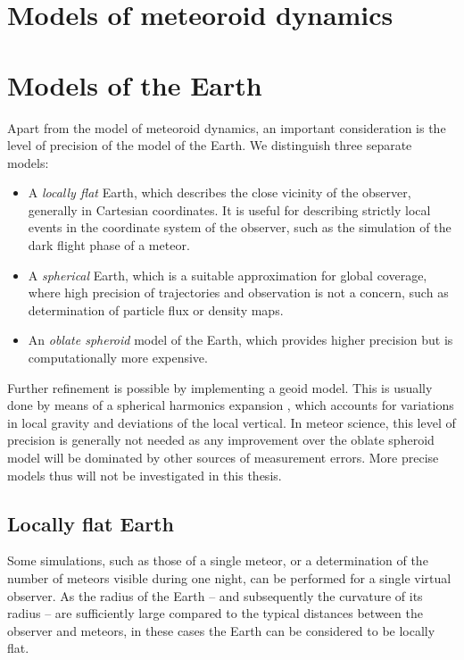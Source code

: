 



\section{Models of meteoroid dynamics} \label{mm}





\section{Models of the Earth} \label{mE}
    Apart from the model of meteoroid dynamics, an important consideration is the level of precision
    of the model of the Earth. We distinguish three separate models:

    \begin{itemize}
        \item A \emph{locally flat} Earth, which describes the close vicinity of the observer,
            generally in Cartesian coordinates. It is useful for describing strictly local events
            in the coordinate system of the observer, such as the simulation of the dark flight phase of a meteor.
        \item A \emph{spherical} Earth, which is a suitable approximation for global coverage,
            where high precision of trajectories and observation is not a concern, such as determination
            of particle flux or density maps.
        \item An \emph{oblate spheroid} model of the Earth, which provides higher
            precision but is computationally more expensive.
    \end{itemize}

    Further refinement is possible by implementing a geoid model. This is usually done by means of
    a spherical harmonics expansion \cite{???}, which accounts for variations in local gravity
    and deviations of the local vertical.
    In meteor science, this level of precision is generally not needed as any improvement over the
    oblate spheroid model will be dominated by other sources of measurement errors.
    More precise models thus will not be investigated in this thesis.

    \subsection{Locally flat Earth} \label{mEf}
        Some simulations, such as those of a single meteor, or a determination of
        the number of meteors visible during one night, can be performed for a single virtual observer.
        As the radius of the Earth -- and subsequently the curvature of its radius -- are
        sufficiently large compared to the typical distances between the observer and meteors,
        in these cases the Earth can be considered to be locally flat.

